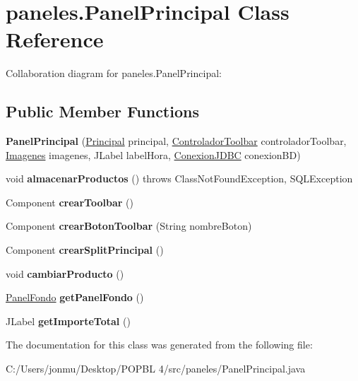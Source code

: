 \hypertarget{classpaneles_1_1_panel_principal}{}\section{paneles.\+Panel\+Principal Class Reference}
\label{classpaneles_1_1_panel_principal}


Collaboration diagram for paneles.\+Panel\+Principal\+:
\subsection*{Public Member Functions}
\begin{DoxyCompactItemize}
\item 
\mbox{\label{classpaneles_1_1_panel_principal_a8f8bc1a008744e424eec12eae5e0a745}} 
{\bfseries Panel\+Principal} (\mbox{\hyperlink{classvistas_1_1_principal}{Principal}} principal, \mbox{\hyperlink{classcontroladores_1_1_controlador_toolbar}{Controlador\+Toolbar}} controlador\+Toolbar, \mbox{\hyperlink{classimagenes_1_1_imagenes}{Imagenes}} imagenes, J\+Label label\+Hora, \mbox{\hyperlink{classmysql_1_1_conexion_j_d_b_c}{Conexion\+J\+D\+BC}} conexion\+BD)
\item 
\mbox{\label{classpaneles_1_1_panel_principal_ad46c27384163d0757eadfe86cf72ee70}} 
void {\bfseries almacenar\+Productos} ()  throws Class\+Not\+Found\+Exception, S\+Q\+L\+Exception 
\item 
\mbox{\label{classpaneles_1_1_panel_principal_accd82709ae4701f14d1b5a4bbb8f3aae}} 
Component {\bfseries crear\+Toolbar} ()
\item 
\mbox{\label{classpaneles_1_1_panel_principal_a45d159d89db6217a595c166bf2f0b2ea}} 
Component {\bfseries crear\+Boton\+Toolbar} (String nombre\+Boton)
\item 
\mbox{\label{classpaneles_1_1_panel_principal_abf6e9ec8437453a751ea1a4bcc33fb87}} 
Component {\bfseries crear\+Split\+Principal} ()
\item 
\mbox{\label{classpaneles_1_1_panel_principal_aa2151461e479985277d05375c02b1022}} 
void {\bfseries cambiar\+Producto} ()
\item 
\mbox{\label{classpaneles_1_1_panel_principal_ab8efee7c290494ba31d026c47dbbcefb}} 
\mbox{\hyperlink{classpaneles_1_1_panel_fondo}{Panel\+Fondo}} {\bfseries get\+Panel\+Fondo} ()
\item 
\mbox{\label{classpaneles_1_1_panel_principal_a5ee2138a32b7b6bc6a0f7b3bd68f4821}} 
J\+Label {\bfseries get\+Importe\+Total} ()
\end{DoxyCompactItemize}


The documentation for this class was generated from the following file\+:\begin{DoxyCompactItemize}
\item 
C\+:/\+Users/jonmu/\+Desktop/\+P\+O\+P\+B\+L 4/src/paneles/Panel\+Principal.\+java\end{DoxyCompactItemize}

